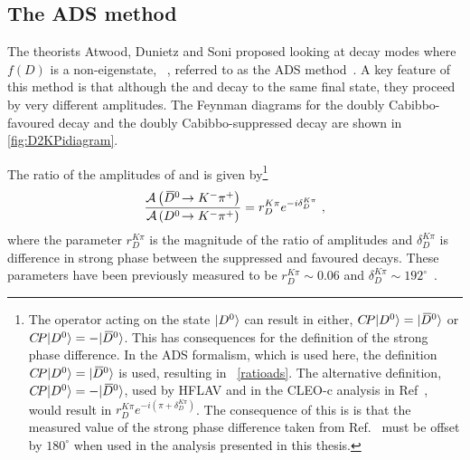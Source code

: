 \subsection{The ADS method}
\label{sec:theory:ads}

The theorists Atwood, Dunietz and Soni proposed looking at \D decay modes where $f(D)$ is a non-\CP eigenstate, \eg~\decay{\D}{\Km\pip}, referred to as the ADS method~\cite{ADS,ADS-2001}. A key feature of this method is that although the \Dz and \Dzb decay to the same final state, they proceed by very different amplitudes. The Feynman diagrams for the doubly Cabibbo-favoured \decay{\Dz}{\Km\pip} decay and the doubly Cabibbo-suppressed \decay{\Dz}{\Kp\pim} decay are shown in \fig\ref{fig:D2KPidiagram}.


The ratio of the amplitudes of \decay{\Dzb}{\Km\pip} and \decay{\Dz}{\Km\pip} is given by\footnote{The \CP operator acting on the state $|{{D}^0}\rangle$ can result in either, ${C\!P}|{{D}^0}\rangle = |{{\kern 0.2em\overline{\kern -0.2em D}{}}{}^0}\rangle$ or ${C\!P}|{{D}^0}\rangle = - |{{\kern 0.2em\overline{\kern -0.2em D}{}}{}^0}\rangle$. This has consequences for the definition of the strong phase difference. In the ADS formalism, which is used here, the definition ${C\!P}|{{D}^0}\rangle = |{{\kern 0.2em\overline{\kern -0.2em D}{}}{}^0}\rangle$ is used, resulting in \eqn~\ref{ratioads}. The alternative definition, ${C\!P}|{{D}^0}\rangle = - |{{\kern 0.2em\overline{\kern -0.2em D}{}}{}^0}\rangle$, used by HFLAV and in the CLEO-c analysis in Ref~\cite{charmkpi_deltab}, would result in $r_D^{K\pi}e^{-i(\pi + \delta_D^{K\pi})}$. The consequence of this is is that the measured value of the strong phase difference taken from Ref.~\cite{charmkpi_deltab} must be offset by $180^{\circ}$ when used in the analysis presented in this thesis.}
\begin{equation}
\frac{\mathcal{A}\left({{\kern 0.2em\overline{\kern -0.2em D}{}}{}^0}\!\rightarrow {\ensuremath{{K}^-}}{\ensuremath{{\pi}^+}}\right)}{\mathcal{A}\left({{D}^0}\!\rightarrow {\ensuremath{{K}^-}}{\ensuremath{{\pi}^+}}\right)} = r_D^{K\pi}e^{-i\delta_D^{K\pi}} \text { ,}
\label{ratioads}
\end{equation}
where the parameter $r_D^{K\pi}$ is the magnitude of the ratio of amplitudes and $\delta_D^{K\pi}$ is difference in strong phase between the suppressed and favoured decays. These parameters have been previously measured to be $r_D^{K\pi} \sim 0.06$ and $\delta_D^{K\pi} \sim 192^{\circ}$~\cite{HFAG}.

